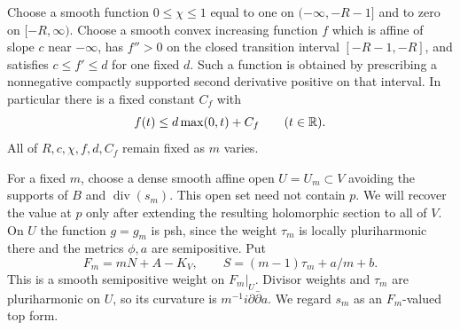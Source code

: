 Choose a smooth function $0\le\chi\le1$ equal to one on
$(-\infty,-R-1]$ and to zero on $[-R,\infty)$.  Choose a smooth
convex increasing function $f$ which is affine of slope $c$ near
$-\infty$, has $f''>0$ on the closed transition interval
$[-R-1,-R]$, and satisfies $c\le f'\le d$ for one fixed $d$.  Such a
function is obtained by prescribing a nonnegative compactly supported
second derivative positive on that interval.  In particular there is
a fixed constant $C_f$ with
\begin{equation}\label{eq:convex-weight-bound}
 f(t)\le d\max(0,t)+C_f\qquad(t\in\mathbb R).
\end{equation}
All of $R,c,\chi,f,d,C_f$ remain fixed as $m$ varies.

For a fixed $m$, choose a dense smooth affine open $U=U_m\subset V$
avoiding the supports of $B$ and $\operatorname{div}(s_m)$. This open
set need not contain $p$. We will recover the value at $p$ only after
extending the resulting holomorphic section to all of $V$. On $U$
the function $g=g_m$ is psh, since the weight $\tau_m$ is locally
pluriharmonic there and the metrics $\phi,a$ are semipositive.  Put
\begin{equation}\label{eq:local-adjoint-weight}
 F_m=mN+A-K_V,\qquad
 S=(m-1)\tau_m+a/m+b.
\end{equation}
This is a smooth semipositive weight on $F_m|_U$.  Divisor weights and
$\tau_m$ are pluriharmonic on $U$, so its curvature is
$m^{-1}i\partial\bar\partial a$.  We regard $s_m$ as an
$F_m$-valued top form.


